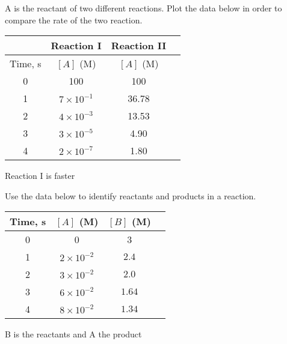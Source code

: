 \documentclass[main.tex]{subfiles}
\begin{document}
\begin{multicols*}{2}
\begin{question}[ID=\the\value{numA}]
A is the reactant of two different reactions. Plot the data below in order to compare the rate of the two reaction.
\begin{center}\begin{tabular}[t]{  c c  c c     }
\toprule
 &Reaction I&		Reaction II	 \\
\toprule
Time, s	&	$[A]$ (M)	&		$[A]$ (M)	 \\
\midrule
0&	100	&	100	\\
1&	$7\times 10^{-1}$	&	36.78	\\
2&	$4\times 10^{-3}$	&	13.53	\\
3&	$3\times 10^{-5}$	&	4.90	\\
4&	$2\times 10^{-7}$	&	1.80	\\
\bottomrule
\end{tabular}\end{center}
\end{question}
\begin{solution}
Reaction I is faster
\hspace{0.1cm}\end{solution}%


\begin{question}[ID=\the\value{numA}]
Use the data below to identify reactants and products in a reaction.
\begin{center}\begin{tabular}[t]{  c c  c c     }
\toprule
Time, s	&	$[A]$ (M)	&		$[B]$ (M)	 \\
\midrule
0&	0&	3		\\
1	&	$2\times 10^{-2}$&	$2.4 $	\\
2	&	$3\times 10^{-2}$	&	$2.0 $\\
3&	$6\times 10^{-2}$&	$1.64 $		\\
4&	$8\times 10^{-2}$&	$1.34 $		\\
\bottomrule
\end{tabular}\end{center}
\end{question}
\begin{solution}
B is the reactants and A the product
\hspace{0.1cm}\end{solution}%



\end{multicols*}
\end{document}
